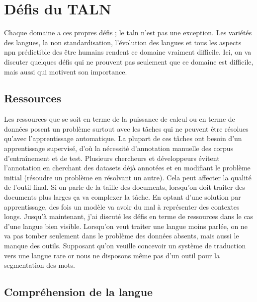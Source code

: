 \documentclass{KodeBook}
\begin{document}
\section{Défis du TALN}

Chaque domaine a ces propres défis ; le \ac{taln} n'est pas une exception. 
Les variétés des langues, la non standardisation, l'évolution des langues et tous les aspects npn prédictible des être humains rendent ce domaine vraiment difficile.
Ici, on va discuter quelques défis qui ne prouvent pas seulement que ce domaine est difficile, mais aussi qui motivent son importance.

\subsection{Ressources}

Les ressources que se soit en terme de la puissance de calcul ou en terme de données posent un problème surtout avec les tâches qui ne peuvent être résolues qu'avec l'apprentissage automatique.
La plupart de ces tâches ont besoin d'un apprentissage supervisé, d'où la nécessité d'annotation manuelle des corpus d'entraînement et de test. 
Plusieurs chercheurs et développeurs évitent l'annotation en cherchant des datasets déjà annotées et en modifiant le problème initial (résoudre un problème en résolvant un autre). 
Cela peut affecter la qualité de l'outil final. 
Si on parle de la taille des documents, lorsqu'on doit traiter des documents plus larges ça va complexer la tâche. 
En optant d'une solution par apprentissage, des fois un modèle va avoir du mal à représenter des contextes longs. 
Jusqu'à maintenant, j'ai discuté les défis en terme de ressources dans le cas d'une langue bien visible. 
Lorsqu'on veut traiter une langue moins parlée, on ne va pas tomber seulement dans le problème des données absents, mais aussi le manque des outils. 
Supposant qu'on veuille concevoir un système de traduction vers une langue rare or nous ne disposons même pas d'un outil pour la segmentation des mots.

\subsection{Compréhension de la langue}
\end{document}
